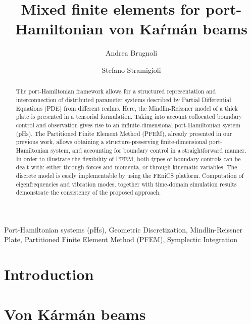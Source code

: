 \documentclass{ifacconf}
\begin{document}
\begin{frontmatter}

\title{Mixed finite elements for port-Hamiltonian von Ka\'rm\'an beams} 


\author[UT]{Andrea Brugnoli}
\author[UT]{Stefano Stramigioli}
\address[UT]{University of Twente, Enschede (NL) \\
	a.brugnoli@utwente.nl, s.stramigioli@utwente.nl }

\begin{abstract}
The port-Hamiltonian framework allows for a structured representation and interconnection of distributed parameter systems described by Partial Differential Equations (PDE) from different realms. Here, the Mindlin-Reissner model of a thick plate is presented in a tensorial formulation. Taking into account collocated boundary control and observation gives rise to an infinite-dimensional port-Hamiltonian system (pHs). The Partitioned Finite Element Method (PFEM), already presented in our previous work, allows obtaining a structure-preserving finite-dimensional port-Hamiltonian system, and accounting for boundary control in a straightforward manner. In order to illustrate the flexibility of PFEM, both types of boundary controls can be dealt with: either through forces and momenta, or through kinematic variables. The discrete model is easily implementable by using the FEniCS platform. Computation of eigenfrequencies and vibration modes, together with time-domain simulation results demonstrate the consistency of the proposed approach.
\end{abstract}

\begin{keyword}
Port-Hamiltonian systems (pHs), Geometric Discretization, Mindlin-Reissner Plate, Partitioned Finite Element Method (PFEM), Symplectic Integration
\end{keyword}

\end{frontmatter}

\section{Introduction}

\section{Von K\'arm\'an beams}
\end{document}
